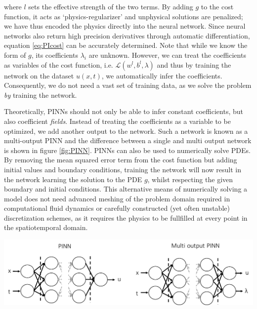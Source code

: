 \documentclass{Dissertate}
\let\origfigure\figure
\let\endorigfigure\endfigure
\renewenvironment{figure}[1][2] {
    \expandafter\origfigure\expandafter[H]
} {
    \endorigfigure
}
\begin{document}
where \(l\) sets the effective strength of the two terms. By adding
\(g\) to the cost function, it acts as `physics-regularizer' and
unphysical solutions are penalized; we have thus encoded the physics
directly into the neural network. Since neural networks also return high precision derivatives through automatic differentiation, equation \ref{eq:PIcost} can be accurately determined. Note that while we know the form of
\(g\), its coefficients \(\lambda_i\) are unknown. However, we can treat
the coefficients as variables of the cost function, i.e.
\(\mathcal{L}(w^l,b^l, \lambda)\) and thus by training the network on
the dataset \(u(x,t)\), we automatically infer the coefficients.
Consequently, we do not need a vast set of training data, as we solve the
problem \emph{by} training the network.

Theoretically, PINNs should not only be able to infer constant
coefficients, but also coefficient \emph{fields}. Instead of treating
the coefficients as a variable to be optimized, we add another output to
the network. Such a network is known as a multi-output PINN and the
difference between a single and multi output network is shown in figure
\ref{fig:PINN}. PINNs can also be used to numerically solve PDEs.
By removing the mean squared error term from the cost function but
adding initial values and boundary conditions, training the network will
now result in the network learning the solution to the PDE \(g\), whilst
respecting the given boundary and initial conditions. This alternative
means of numerically solving a model does not need advanced meshing of
the problem domain required in computational fluid dynamics or carefully
constructed (yet often unstable) discretization schemes, as it requires
the physics to be fullfilled at every point in the spatiotemporal
domain.

\begin{figure}
\hypertarget{fig:PINN}{%
\centering
\includegraphics{source/figures/pdf/PINN.pdf}
\caption{\textbf{Left panel:} a single output PINN. \textbf{Right
panel:} A multi-output PINN. The network now also predicts the
coefficients values at each data point.}\label{fig:PINN}
}
\end{figure}
\end{document}
